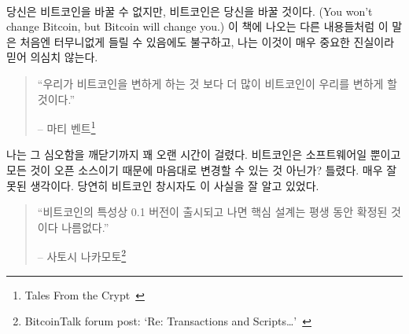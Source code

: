 \paragraph{}
당신은 비트코인을 바꿀 수 없지만, 비트코인은 당신을 바꿀 것이다.
(You won't change Bitcoin, but Bitcoin will change you.)
이 책에 나오는 다른 내용들처럼 이 말은 처음엔 터무니없게 들릴 수 있음에도 불구하고, 
나는 이것이 매우 중요한 진실이라 믿어 의심치 않는다.

\begin{quotation}\begin{samepage}
		\enquote{우리가 비트코인을 변하게 하는 것 보다 더 많이 비트코인이 우리를 변하게 할 것이다.}
		\begin{flushright} -- 마티 벤트\footnote{Tales From the Crypt~\cite{tftc21}}
\end{flushright}\end{samepage}\end{quotation}

나는 그 심오함을 깨닫기까지 꽤 오랜 시간이 걸렸다.
비트코인은 소프트웨어일 뿐이고 모든 것이 오픈 소스이기 때문에 마음대로 변경할 수 있는 것 아닌가? 
틀렸다. 매우 잘못된 생각이다. 
당연히 비트코인 창시자도 이 사실을 잘 알고 있었다.

\begin{quotation}\begin{samepage}
		\enquote{비트코인의 특성상 0.1 버전이 출시되고 나면 핵심 설계는 평생 동안 확정된 것이다 나름없다.}
		\begin{flushright} -- 사토시 나카모토\footnote{BitcoinTalk forum post: `Re:
				Transactions and Scripts\ldots'~\cite{satoshi-set-in-stone}}
\end{flushright}\end{samepage}\end{quotation}

